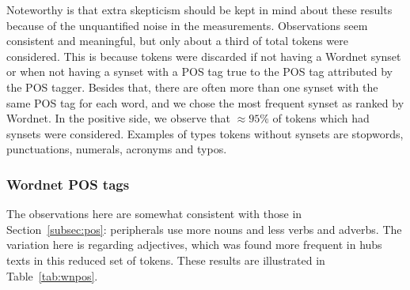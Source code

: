 Noteworthy is that extra skepticism should be kept in mind about these results
because of the unquantified noise in the measurements.
Observations seem consistent and meaningful, but only about a third of total tokens
were considered.
This is because tokens were discarded if not having a Wordnet synset
or when not having a synset with a POS tag true to the POS tag attributed by the POS tagger.
Besides that, there are often more than one synset with the same POS tag for each word,
and we chose the most frequent synset as ranked by Wordnet.
In the positive side, we observe that $\approx 95\%$ of tokens which had synsets
were considered.
Examples of types tokens without synsets are stopwords, punctuations, numerals, acronyms and typos.

\subsubsection{Wordnet POS tags}\label{subsec:wnpos}
The observations here are somewhat consistent with those in Section~\ref{subsec:pos}:
peripherals use more nouns and less verbs and adverbs.
The variation here is regarding adjectives, which was found more frequent in hubs texts
in this reduced set of tokens.
These results are illustrated in Table~\ref{tab:wnpos}.

\FloatBarrier


